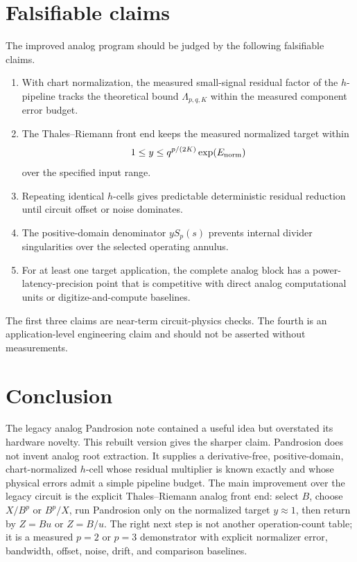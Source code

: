 \documentclass[11pt]{article}
\begin{document}
\section{Falsifiable claims}

The improved analog program should be judged by the following falsifiable
claims.

\begin{enumerate}[leftmargin=2em]
\item With chart normalization, the measured small-signal residual factor of
the \(h\)-pipeline tracks the theoretical bound
\(\Lambda_{p,q,K}\) within the measured component error budget.
\item The Thales--Riemann front end keeps the measured normalized target within
\[
        1\le y\le q^{p/(2K)}\exp(E_{\rm norm})
\]
over the specified input range.
\item Repeating identical \(h\)-cells gives predictable deterministic residual
reduction until circuit offset or noise dominates.
\item The positive-domain denominator \(yS_p(s)\) prevents internal divider
singularities over the selected operating annulus.
\item For at least one target application, the complete analog block has a
power-latency-precision point that is competitive with direct analog
computational units or digitize-and-compute baselines.
\end{enumerate}

The first three claims are near-term circuit-physics checks.  The fourth is an
application-level engineering claim and should not be asserted without
measurements.

\section{Conclusion}

The legacy analog Pandrosion note contained a useful idea but overstated its
hardware novelty.  This rebuilt version gives the sharper claim.  Pandrosion
does not invent analog root extraction.  It supplies a derivative-free,
positive-domain, chart-normalized \(h\)-cell whose residual multiplier is known
exactly and whose physical errors admit a simple pipeline budget.  The main
improvement over the legacy circuit is the explicit Thales--Riemann analog
front end: select \(B\), choose \(X/B^p\) or \(B^p/X\), run Pandrosion only on
the normalized target \(y\approx1\), then return by \(Z=Bu\) or \(Z=B/u\).
The right next step is not another operation-count table; it is a measured
\(p=2\) or \(p=3\) demonstrator with explicit normalizer error, bandwidth,
offset, noise, drift, and comparison baselines.
\end{document}
